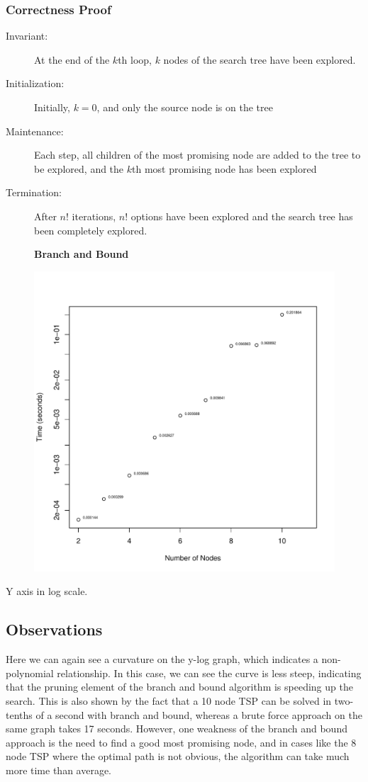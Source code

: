 \documentclass[a4paper,12pt]{article}
\begin{document}
\subsubsection{Correctness Proof}
\begin{description}
\item [Invariant: ] At the end of the $k$th loop, $k$ nodes of the search tree have been explored.
\item [Initialization: ] Initially, $k = 0$, and only the source node is on the tree 
\item [Maintenance: ] Each step, all children of the most promising node are added to the tree to be explored, and the $k$th most promising node has been explored
\item [Termination: ] After $n!$ iterations, $n!$ options have been explored and the search tree has been completely explored.
\end{description}
\begin{figure}[H]
  \centering
  \textbf{Branch and Bound}\par\medskip
  \includegraphics[width=1\linewidth]{BranchAndBound.pdf}
\end{figure}
Y axis in log scale.
\subsection{Observations}
Here we can again see a curvature on the y-log graph, which indicates a non-polynomial relationship. In this case, we can see the curve is less steep, indicating that the pruning element of the branch and bound algorithm is speeding up the search. This is also shown by the fact that a 10 node TSP can be solved in two-tenths of a second with branch and bound, whereas a brute force approach on the same graph takes 17 seconds. However, one weakness of the branch and bound approach is the need to find a good most promising node, and in cases like the 8 node TSP where the optimal path is not obvious, the algorithm can take much more time than average.
\end{document}
